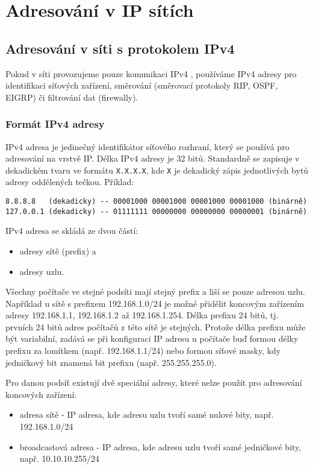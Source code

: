 \section{Adresování v IP sítích}\label{ip_addressing}
\subsection{Adresování v síti s protokolem IPv4}\label{adresy_ipv4}
Pokud v síti provozujeme pouze komunikaci IPv4 \cite{rfc791}, používáme IPv4 adresy pro identifikaci síťových zařízení, směrování (směrovací protokoly RIP, OSPF, EIGRP) či filtrování dat (firewally). 
\subsubsection{Formát IPv4 adresy}
IPv4 adresa je jedinečný identifikátor síťového rozhraní, který se používá pro adresování na vrstvě IP. Délka IPv4 adresy je 32 bitů. Standardně se zapisuje v dekadickém tvaru ve formátu {\tt X.X.X.X}, kde {\tt X} je dekadický zápis jednotlivých bytů adresy oddělených tečkou. Příklad:
\begin{verbatim}
8.8.8.8   (dekadicky) -- 00001000 00001000 00001000 00001000 (binárně)
127.0.0.1 (dekadicky) -- 01111111 00000000 00000000 00000001 (binárně)  
\end{verbatim}

IPv4 adresa se skládá ze dvou částí:
\begin{itemize}
    \item adresy sítě (prefix) a
    \item adresy uzlu.
\end{itemize}

Všechny počítače ve stejné podsíti mají stejný prefix a liší se pouze adresou uzlu. Například u sítě s prefixem 192.168.1.0/24 je možné přidělit koncovým zařízením adresy 192.168.1.1, 192.168.1.2 až 192.168.1.254. Délka prefixu 24 bitů, tj. prvních 24 bitů adres počítačů z této sítě je stejných. Protože délka prefixu může být variabilní, zadává se při konfiguraci IP adresu u počítače buď formou délky prefixu za lomítkem (např. 192.168.1.1/24) nebo formou síťové masky, kdy jedničkový bit znamená bit prefixu (např. 255.255.255.0). 

\medskip
\noindent
Pro danou podsíť existují dvě speciální adresy, které nelze použít pro adresování koncových zařízení: 
\begin{itemize}
    \item adresa sítě - IP adresa, kde adresu uzlu tvoří samé nulové bity, např. 192.168.1.0/24
    \item broadcastová adresa - IP adresa, kde adresu uzlu tvoří samé jedničkové bity, např. 10.10.10.255/24
\end{itemize}

